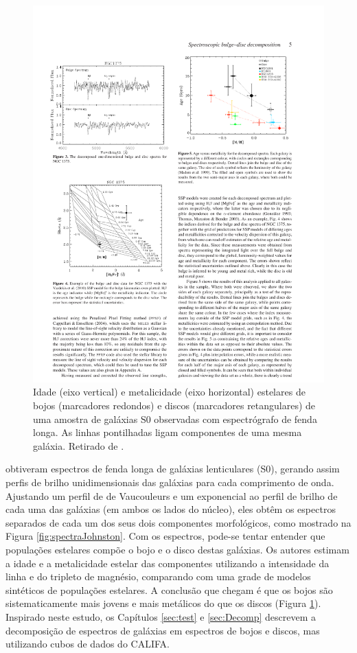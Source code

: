 \begin{figure}
	\includegraphics{figuras/johnston-pop}
	\caption[Idade e metalicidade de bojos e discos de galáxias S0] {Idade (eixo
	vertical) e metalicidade (eixo horizontal) estelares de bojos (marcadores
	redondos) e discos (marcadores retangulares) de uma amostra de galáxias S0
	observadas com espectrógrafo de fenda longa. As linhas pontilhadas ligam
	componentes de uma mesma galáxia. Retirado de \citet{Johnston2012}.}
	\label{fig:populationJohnston}
\end{figure}

\citet{Johnston2012} obtiveram espectros de fenda longa de galáxias lenticulares
(S0), gerando assim perfis de brilho unidimensionais das galáxias para cada
comprimento de onda. Ajustando um perfil de de Vaucouleurs e um exponencial ao
perfil de brilho de cada uma das galáxias (em ambos os lados do núcleo), eles
obtêm os espectros separados de cada um dos seus dois componentes morfológicos,
como mostrado na Figura \ref{fig:spectraJohnston}. Com os espectros, pode-se
tentar entender que populações estelares compõe o bojo e o disco destas
galáxias. Os autores estimam a idade e a metalicidade estelar das componentes
utilizando a intensidade da linha \Hbeta e do tripleto de magnésio, comparando
com uma grade de modelos sintéticos de populações estelares. A conclusão que
chegam é que os bojos são sistematicamente mais jovens e mais metálicos do que
os discos (Figura \ref{fig:populationJohnston}). Inspirado neste estudo, os
Capítulos \ref{sec:test} e \ref{sec:Decomp} descrevem a decomposição de
espectros de galáxias em espectros de bojos e discos, mas utilizando cubos de
dados do CALIFA.

